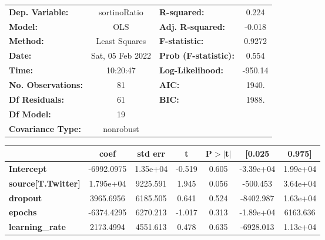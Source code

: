 \begin{center}
\begin{tabular}{lclc}
\toprule
\textbf{Dep. Variable:}                   &   sortinoRatio   & \textbf{  R-squared:         } &     0.224   \\
\textbf{Model:}                           &       OLS        & \textbf{  Adj. R-squared:    } &    -0.018   \\
\textbf{Method:}                          &  Least Squares   & \textbf{  F-statistic:       } &    0.9272   \\
\textbf{Date:}                            & Sat, 05 Feb 2022 & \textbf{  Prob (F-statistic):} &    0.554    \\
\textbf{Time:}                            &     10:20:47     & \textbf{  Log-Likelihood:    } &   -950.14   \\
\textbf{No. Observations:}                &          81      & \textbf{  AIC:               } &     1940.   \\
\textbf{Df Residuals:}                    &          61      & \textbf{  BIC:               } &     1988.   \\
\textbf{Df Model:}                        &          19      & \textbf{                     } &             \\
\textbf{Covariance Type:}                 &    nonrobust     & \textbf{                     } &             \\
\bottomrule
\end{tabular}
\begin{tabular}{lcccccc}
                                          & \textbf{coef} & \textbf{std err} & \textbf{t} & \textbf{P$> |$t$|$} & \textbf{[0.025} & \textbf{0.975]}  \\
\midrule
\textbf{Intercept}                        &   -6992.0975  &     1.35e+04     &    -0.519  &         0.605        &    -3.39e+04    &     1.99e+04     \\
\textbf{source[T.Twitter]}                &    1.795e+04  &     9225.591     &     1.945  &         0.056        &     -500.453    &     3.64e+04     \\
\textbf{dropout}                          &    3965.6956  &     6185.505     &     0.641  &         0.524        &    -8402.987    &     1.63e+04     \\
\textbf{epochs}                           &   -6374.4295  &     6270.213     &    -1.017  &         0.313        &    -1.89e+04    &     6163.636     \\
\textbf{learning\_rate}                   &    2173.4994  &     4551.613     &     0.478  &         0.635        &    -6928.013    &     1.13e+04     \\

\end{tabular}
\end{center}
